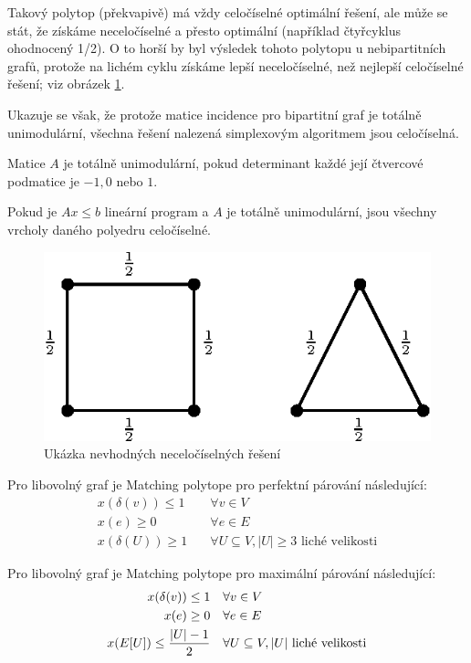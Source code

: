 Takový polytop (překvapivě) má vždy celočíselné optimální řešení, ale může se
stát, že získáme neceločíselné a přesto optimální (například čtyřcyklus
ohodnocený 1/2). O to horší by byl výsledek tohoto polytopu u nebipartitních
grafů, protože na lichém cyklu získáme lepší neceločíselné, než nejlepší
celočíselné řešení; viz obrázek \ref{matching-polytope}.

Ukazuje se však, že protože matice incidence pro bipartitní graf je totálně
unimodulární, všechna řešení nalezená simplexovým algoritmem jsou celočíselná.

\df Matice $A$ je totálně unimodulární, pokud determinant každé její čtvercové
podmatice je $-1, 0$ nebo $1$.

\df Pokud je $Ax \leq b$ lineární program a $A$ je totálně unimodulární, jsou
všechny vrcholy daného polyedru celočíselné.

\begin{figure}[h!]
	\centering
	\includegraphics{img/matching-polytope.eps}
	\caption{Ukázka nevhodných neceločíselných řešení}
	\label{matching-polytope}
\end{figure}

\tv Pro libovolný graf je Matching polytope pro perfektní párování následující:
\begin{align}
	x(\delta(v)) \leq 1  & \quad  \forall v \in V \\
	x(e) \geq 0 & \quad \forall e  \in E \\
	x(\delta(U)) \geq 1 & \quad \forall U \subseteq V, |U| \geq 3 \text{ liché
velikosti}
\end{align}

\tv Pro libovolný graf je Matching polytope pro maximální párování následující:
\begin{align}
	x(\delta(v)) \leq 1  & \quad  \forall v \in V \\
	x(e) \geq 0 & \quad \forall e  \in E \\
	x(E[U]) \leq {|U|-1 \over 2} & \quad \forall U \subseteq V, |U| \text{ liché
velikosti}
\end{align}
